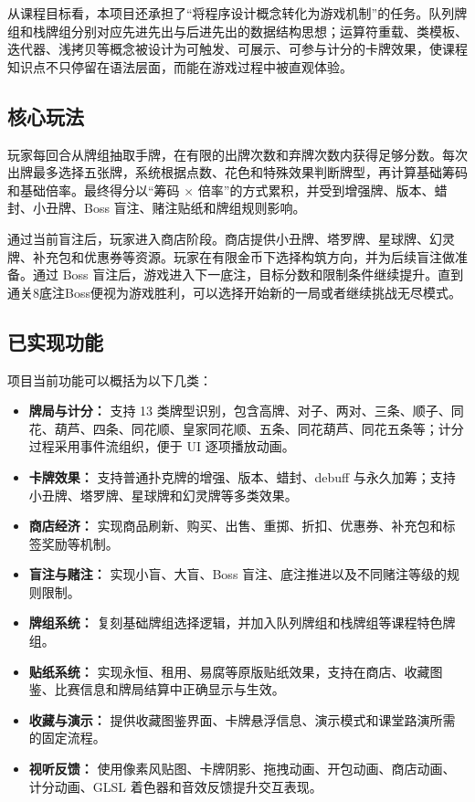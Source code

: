 \documentclass[UTF8,11pt,a4paper]{ctexart}
\begin{document}
从课程目标看，本项目还承担了“将程序设计概念转化为游戏机制”的任务。队列牌组和栈牌组分别对应先进先出与后进先出的数据结构思想；运算符重载、类模板、迭代器、浅拷贝等概念被设计为可触发、可展示、可参与计分的卡牌效果，使课程知识点不只停留在语法层面，而能在游戏过程中被直观体验。

\subsection{核心玩法}

玩家每回合从牌组抽取手牌，在有限的出牌次数和弃牌次数内获得足够分数。每次出牌最多选择五张牌，系统根据点数、花色和特殊效果判断牌型，再计算基础筹码和基础倍率。最终得分以“筹码 $\times$ 倍率”的方式累积，并受到增强牌、版本、蜡封、小丑牌、Boss 盲注、赌注贴纸和牌组规则影响。

通过当前盲注后，玩家进入商店阶段。商店提供小丑牌、塔罗牌、星球牌、幻灵牌、补充包和优惠券等资源。玩家在有限金币下选择构筑方向，并为后续盲注做准备。通过 Boss 盲注后，游戏进入下一底注，目标分数和限制条件继续提升。直到通关8底注Boss便视为游戏胜利，可以选择开始新的一局或者继续挑战无尽模式。

\subsection{已实现功能}

项目当前功能可以概括为以下几类：

\begin{itemize}
  \item \textbf{牌局与计分：} 支持 13 类牌型识别，包含高牌、对子、两对、三条、顺子、同花、葫芦、四条、同花顺、皇家同花顺、五条、同花葫芦、同花五条等；计分过程采用事件流组织，便于 UI 逐项播放动画。
  \item \textbf{卡牌效果：} 支持普通扑克牌的增强、版本、蜡封、debuff 与永久加筹；支持小丑牌、塔罗牌、星球牌和幻灵牌等多类效果。
  \item \textbf{商店经济：} 实现商品刷新、购买、出售、重掷、折扣、优惠券、补充包和标签奖励等机制。
  \item \textbf{盲注与赌注：} 实现小盲、大盲、Boss 盲注、底注推进以及不同赌注等级的规则限制。
  \item \textbf{牌组系统：} 复刻基础牌组选择逻辑，并加入队列牌组和栈牌组等课程特色牌组。
  \item \textbf{贴纸系统：} 实现永恒、租用、易腐等原版贴纸效果，支持在商店、收藏图鉴、比赛信息和牌局结算中正确显示与生效。
  \item \textbf{收藏与演示：} 提供收藏图鉴界面、卡牌悬浮信息、演示模式和课堂路演所需的固定流程。
  \item \textbf{视听反馈：} 使用像素风贴图、卡牌阴影、拖拽动画、开包动画、商店动画、计分动画、GLSL 着色器和音效反馈提升交互表现。
\end{itemize}
\end{document}
